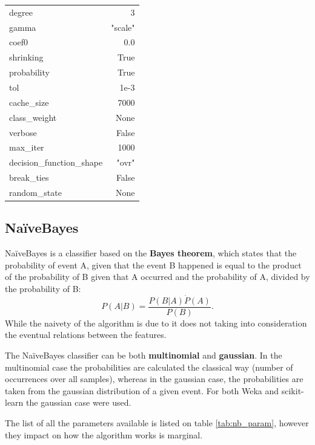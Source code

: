 \begin{table}[H]
\begin{subtable}[t]{.5\linewidth}
\begin{tabular}{lr}
            degree & 3 \\
            gamma & "scale" \\
            coef0 & 0.0 \\
            shrinking & True \\
            probability & True \\
            tol & 1e-3 \\
            cache\_size & 7000 \\
            class\_weight & None \\
            verbose & False \\
            max\_iter & 1000 \\
            decision\_function\_shape & "ovr" \\
            break\_ties & False \\
            random\_state & None \\\bottomrule
        \end{tabular}
    \end{subtable}%
\end{table}
 
\subsection{NaïveBayes}
NaïveBayes is a classifier based on the \textbf{Bayes theorem}, which states that the probability of event A, given that the event B happened is equal to the product of the probability of B given that A occurred and the probability of A, divided by the probability of B:
\begin{equation}
    P(A|B) = \frac{P(B|A)\dot P(A)}{P(B)}.
\end{equation}
While the naivety of the algorithm is due to it does not taking into consideration the eventual relations between the features.

The NaïveBayes classifier can be both \textbf{multinomial} and \textbf{gaussian}. In the multinomial case the probabilities are calculated the classical way (number of occurrences over all samples), whereas in the gaussian case, the probabilities are taken from the gaussian distribution of a given event. For both Weka and scikit-learn the gaussian case were used.

The list of all the parameters available is listed on table \ref{tab:nb_param}, however they impact on how the algorithm works is marginal. 

